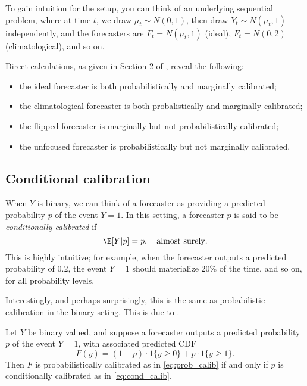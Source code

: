 \documentclass{article}
\begin{document}
To gain intuition for the setup, you can think of an underlying sequential
problem, where at time $t$, we draw $\mu_t \sim N(0,1)$, then draw $Y_t \sim
N(\mu_t, 1)$ independently, and the forecasters are $F_t = N(\mu_t, 1)$ (ideal),
$F_t = N(0, 2)$ (climatological), and so on.

Direct calculations, as given in Section 2 of \citet{gneiting2007probabilistic}, 
reveal the following: 

\begin{itemize}
\item the ideal forecaster is both probabilistically and marginally calibrated;  
\item the climatological forecaster is both probalistically and marginally
  calibrated;
\item the flipped forecaster is marginally but not probabilistically
  calibrated; 
\item the unfocused forecaster is probabilistically but not marginally
  calibrated.
\end{itemize}

\subsection{Conditional calibration}

When $Y$ is binary, we can think of a forecaster as providing a predicted
probability $p$ of the event $Y = 1$. In this setting, a forecaster $p$ is said
to be \emph{conditionally calibrated} if
\begin{equation}
\label{eq:cond_calib}
\E[Y|p] = p, \quad \text{almost surely}.  
\end{equation}
This is highly intuitive; for example, when the forecaster outputs a predicted
probability of 0.2, the event $Y=1$ should materialize 20\% of the time, and so
on, for all probability levels. 

Interestingly, and perhaps surprisingly, this is the same as probabilistic
calibration in the binary seting. This is due to \citet{gneiting2013combining}. 

\begin{theorem}
Let $Y$ be binary valued, and suppose a forecaster outputs a predicted
probability $p$ of the event $Y = 1$, with associated predicted CDF 
\[
F(y) = (1-p) \cdot 1\{y \geq 0\} +  p \cdot 1\{y \geq 1\}.
\]
Then $F$ is probabilistically calibrated as in \eqref{eq:prob_calib} if and only 
if $p$ is conditionally calibrated as in \eqref{eq:cond_calib}. 
\end{theorem}
\end{document}
